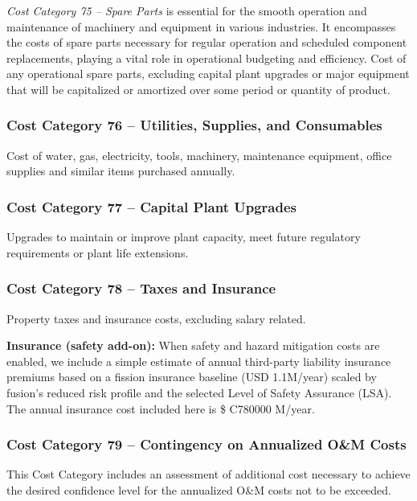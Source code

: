 \textit{Cost Category 75 – Spare Parts} is essential for the smooth operation and maintenance of machinery and equipment in various industries. It encompasses the costs of spare parts necessary for regular operation and scheduled component replacements, playing a vital role in operational budgeting and efficiency.  Cost of any operational spare parts, excluding capital plant upgrades or major equipment that will be capitalized or amortized over some period or quantity of product.

\subsubsection*{Cost Category 76 – Utilities, Supplies, and Consumables}
Cost of water, gas, electricity, tools, machinery, maintenance equipment, office supplies and similar items purchased annually.

\subsubsection*{Cost Category 77 – Capital Plant Upgrades}
Upgrades to maintain or improve plant capacity, meet future regulatory requirements or plant life extensions.

\subsubsection*{Cost Category 78 – Taxes and Insurance}
Property taxes and insurance costs, excluding salary related.
\ifsafetycosts

\textbf{Insurance (safety add-on):} When safety and hazard mitigation costs are enabled, we include a simple estimate of annual third-party liability insurance premiums based on a fission insurance baseline (USD 1.1M/year) scaled by fusion's reduced risk profile and the selected Level of Safety Assurance (LSA). The annual insurance cost included here is \$ C780000 M/year.
\fi

\subsubsection*{Cost Category 79 – Contingency on Annualized O\&M Costs}
This Cost Category includes an assessment of additional cost necessary to achieve the desired confidence level for the annualized O\&M costs not to be exceeded.

